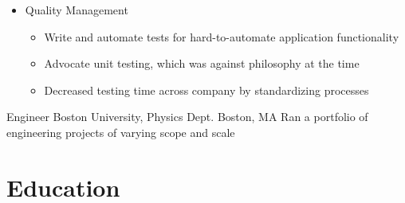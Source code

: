 \documentclass[11pt,letterpaper,roman]{moderncv}
\begin{document}
\begin{itemize}
\begin{itemize}
           \item Managed resource competition and client priorities
           \item Provided agency for client or Murex to optimize utilization of resources
           \item Resolve conflicts between product development and project deliverables
           \item Query end users and develop feedback process to enhance overall product
           \item Negotiated with end users to gain final approval for project deliverables
        \end{itemize}
    \item Quality Management
        \begin{itemize}
           \item Write and automate tests for hard-to-automate application functionality
           \item Advocate unit testing, which was against philosophy at the time
           \item Decreased testing time across company by standardizing processes\newline{}
        \end{itemize}
\end{itemize}
    {Engineer}
    {Boston University, Physics Dept.}
    {Boston, MA}
    {}
    {Ran a portfolio of engineering projects of varying scope and scale}

\section{Education}
\end{document}

